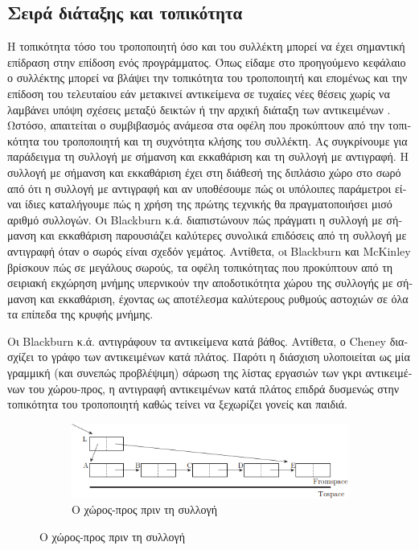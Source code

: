 \begin{greek}
\section{Σειρά διάταξης και τοπικότητα}
Η τοπικότητα τόσο του τροποποιητή όσο και του συλλέκτη μπορεί
να έχει σημαντική επίδραση στην επίδοση ενός προγράμματος. Όπως
είδαμε στο προηγούμενο κεφάλαιο ο συλλέκτης μπορεί να βλάψει
την τοπικότητα του τροποποιητή και επομένως και την επίδοση 
του τελευταίου εάν μετακινεί αντικείμενα σε τυχαίες νέες θέσεις 
χωρίς να λαμβάνει υπόψη σχέσεις μεταξύ δεικτών ή την αρχική 
διάταξη των αντικειμένων \cite{DBLP:conf/oopsla/AbuaiadhOPS04}. 
Ωστόσο, απαιτείται ο συμβιβασμός ανάμεσα στα οφέλη που προκύπτουν 
από την τοπικότητα του τροποποιητή και τη συχνότητα κλήσης του 
συλλέκτη. Ας συγκρίνουμε για παράδειγμα τη συλλογή με σήμανση 
και εκκαθάριση και τη συλλογή με αντιγραφή. Η συλλογή με σήμανση 
και εκκαθάριση έχει στη διάθεσή της διπλάσιο χώρο στο σωρό από 
ότι η συλλογή με αντιγραφή και αν υποθέσουμε πώς οι υπόλοιπες 
παράμετροι είναι ίδιες καταλήγουμε πώς η χρήση της πρώτης τεχνικής 
θα πραγματοποιήσει μισό αριθμό συλλογών. Οι Blackburn κ.ά. \cite{DBLP:conf/icse/BlackburnCM04} διαπιστώνουν πώς πράγματι η
συλλογή με σήμανση και εκκαθάριση παρουσιάζει καλύτερες συνολικά
επιδόσεις από τη συλλογή με αντιγραφή όταν ο σωρός είναι σχεδόν
γεμάτος. Αντίθετα, oι Blackburn και McKinley \cite{DBLP:conf/oopsla/BlackburnM03} βρίσκουν πώς
σε μεγάλους σωρούς, τα οφέλη τοπικότητας που προκύπτουν από τη 
σειριακή εκχώρηση μνήμης υπερνικούν την αποδοτικότητα χώρου
της συλλογής με σήμανση και εκκαθάριση, έχοντας ως αποτέλεσμα
καλύτερους ρυθμούς αστοχιών σε όλα τα επίπεδα της κρυφής μνήμης.

Οι Blackburn κ.ά. \cite{DBLP:conf/icse/BlackburnCM04} αντιγράφουν τα αντικείμενα κατά βάθος.
Αντίθετα, ο Cheney διασχίζει το γράφο των αντικειμένων κατά πλάτος. 
Παρότι η διάσχιση υλοποιείται ως μία γραμμική (και συνεπώς προβλέψιμη) 
σάρωση της λίστας εργασιών των γκρι αντικειμένων του χώρου-προς,
η αντιγραφή αντικειμένων κατά πλάτος επιδρά δυσμενώς στην τοπικότητα
του τροποποιητή καθώς τείνει να ξεχωρίζει γονείς και παιδιά.

\begin{figure}
  \centering
  \begin{subfigure}{1.0\textwidth}
    \includegraphics{figures/cop_1a}
    \caption{Ο χώρος-προς πριν τη συλλογή}
  \end{subfigure}


\end{figure}
\end{greek}
